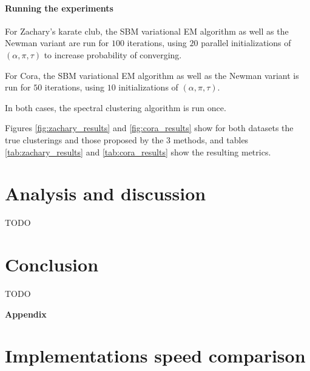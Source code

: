 \documentclass[switch, 12pt]{article}
\begin{document}
\begin{multicols}{2}
    \paragraph{Running the experiments} For Zachary's karate club, the SBM variational EM algorithm as well as the Newman variant are run for $100$ iterations, using $20$ parallel initializations of $(\alpha, \pi, \tau)$ to increase probability of converging.

    For Cora, the SBM variational EM algorithm as well as the Newman variant is run for $50$ iterations, using $10$ initializations of $(\alpha, \pi, \tau)$.

    In both cases, the spectral clustering algorithm is run once.

    Figures \ref{fig:zachary_results} and \ref{fig:cora_results} show for both datasets the true clusterings and those proposed by the 3 methods, and tables \ref{tab:zachary_results} and \ref{tab:cora_results} show the resulting metrics.






    \section{Analysis and discussion}
    \label{sec:discussion}

    TODO



    \section{Conclusion}
    \label{sec:conclusion}

    TODO

    

\end{multicols}

\newpage


\appendix

\begin{center}
    {\Huge \bfseries Appendix} \\[0.5cm]
\end{center}

\section{Implementations speed comparison}
\label{app:speed_comparison}
\end{document}
